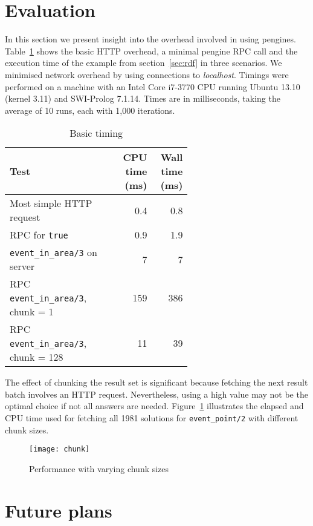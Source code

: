 \documentclass{new_tlp}
\newcommand{\reffont}{\tt}
\newcommand{\predref}[2]{\mbox{\reffont #1/#2}}
\newcommand{\secref}[1]{section~\ref{sec:#1}}
\newcommand{\Figref}[1]{Figure~\ref{fig:#1}}
\newcommand{\Tabref}[1]{Table~\ref{tab:#1}}
\begin{document}
\section{Evaluation}
\label{sec:evaluation}

In this section we present insight into the overhead involved in using
pengines. \Tabref{basictiming} shows the basic HTTP overhead, a minimal
pengine RPC call and the execution time of the example from \secref{rdf}
in three scenarios. We minimised network overhead by using connections
to \textit{localhost}. Timings were performed on a machine with an Intel
Core i7-3770 CPU running Ubuntu 13.10 (kernel 3.11) and SWI-Prolog
7.1.14. Times are in milliseconds, taking the average of 10 runs, each
with 1,000 iterations.

\begin{table}[h]
    \caption{Basic timing}
    \label{tab:basictiming}
\begin{tabular}{p{0.6\linewidth}rr}
\hline\hline
Test	& CPU time (ms) & Wall time (ms) \\
\hline
Most simple HTTP request                      & 0.4 & 0.8 \\
RPC for \texttt{true}                         & 0.9 & 1.9 \\
\predref{event\_in\_area}{3} on server        & 7     &	7 \\
RPC \predref{event\_in\_area}{3}, chunk = 1   & 159   & 386 \\
RPC \predref{event\_in\_area}{3}, chunk = 128 & 11    & 39 \\
\hline\hline
\end{tabular}

\end{table}

The effect of chunking the result set is significant because fetching
the next result batch involves an HTTP request.  Nevertheless, using a
high value may not be the optimal choice if not all answers are needed.
\Figref{chunking} illustrates the elapsed and CPU time used for
fetching all 1981 solutions for \predref{event\_point}{2} with different
chunk sizes.

\begin{figure}[h]
	\texttt{[image: chunk]}
    \caption{Performance with varying chunk sizes}
    \label{fig:chunking}
\end{figure}


\section{Future plans}
\label{sec:plans}
\end{document}
